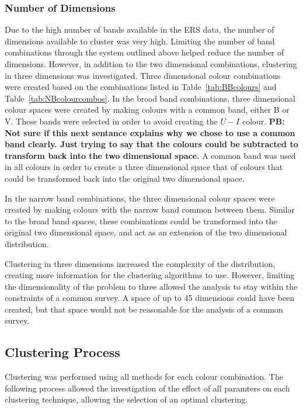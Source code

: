 \subsubsection{Number of Dimensions}
Due to the high number of bands available in the ERS data, the number of dimensions available to cluster was very high.
Limiting the number of band combinations through the system outlined above helped reduce the number of dimensions.
However, in addition to the two dimensional combinations, clustering in three dimensions was investigated.
Three dimensional colour combinations were created based on the combinations listed in Table~\ref{tab:BBcolours} and Table~\ref{tab:NBcolourcombos}.
In the broad band combinations, three dimensional colour spaces were created by making colours with a common band, either B or V.
These bands were selected in order to avoid creating the $U - I$ colour.
\textbf{PB: Not sure if this next sentance explains why we chose to use a common band clearly. Just trying to say that the colours could be subtracted to transform back into the two dimensional space.}
A common band was used in all colours in order to create a three dimensional space that of colours that could be transformed back into the original two dimensional space. 

In the narrow band combinations, the three dimensional colour spaces were created by making colours with the narrow band common between them.
Similar to the broad band spaces, these combinations could be transformed into the original two dimensional space, and act as an extension of the two dimensional distribution.

Clustering in three dimensions increased the complexity of the distribution, creating more information for the clustering algorithms to use.
However, limiting the dimensionality of the problem to three allowed the analysis to stay within the constraints of a common survey.
A space of up to 45 dimensions could have been created, but that space would not be reasonable for the analysis of a common survey.

\subsection{Clustering Process}
Clustering was performed using all methods for each colour combination. 
The following process allowed the investigation of the effect of all paramters on each clustering technique, allowing the selection of an optimal clustering.

